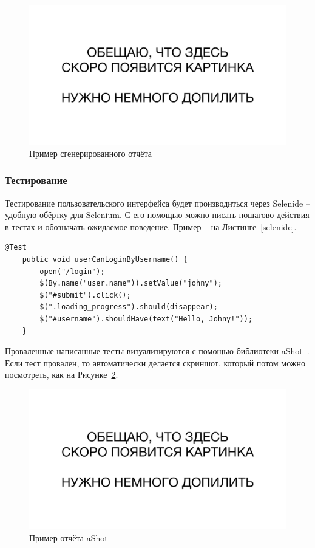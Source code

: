 \documentclass[a4paper,article]{article}
\begin{document}
\begin{sloppypar}
    \begin{figure}[h]
        \centering
        \includegraphics[width=0.8\linewidth]{Сгенерированный отчёт.png}        
        \caption{\centering Пример сгенерированного отчёта}        
        \label{fig:report}
    \end{figure}

    \subsubsection{Тестирование}\label{Реализация. Клиентская часть. Тестирование}
    
    Тестирование пользовательского интерфейса будет производиться через Selenide -- удобную обёртку для Selenium. С его помощью можно писать пошагово действия в тестах и обозначать ожидаемое поведение. Пример -- на Листинге~\ref{selenide}.
    
    \begin{lstlisting}[label=selenide,caption=Пример теста на Selenide]
    @Test
    public void userCanLoginByUsername() {
        open("/login");
        $(By.name("user.name")).setValue("johny");
        $("#submit").click();
        $(".loading_progress").should(disappear);
        $("#username").shouldHave(text("Hello, Johny!"));
    }
    \end{lstlisting}
    
    Проваленные написанные тесты визуализируются с помощью библиотеки aShot~\cite{ashot}. Если тест провален, то автоматически делается скриншот, который потом можно посмотреть, как на Рисунке~\ref{fig:ashot}.
    
    \begin{figure}[h]
        \centering
        \includegraphics[width=0.8\linewidth]{Отчёт aShot.png}        
        \caption{\centering Пример отчёта aShot}        
        \label{fig:ashot}
    \end{figure}
    

\end{sloppypar}
\end{document}
